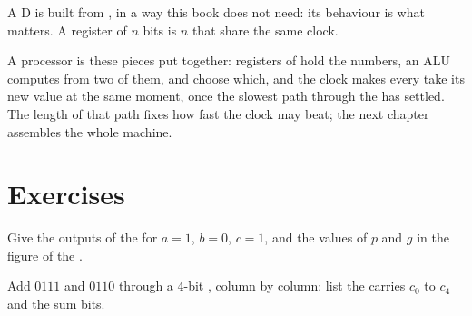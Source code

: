 A D  is built from , in a way this book does not need: its behaviour is what matters. A register of
$n$ bits is $n$  that share the same clock.

\label{lst:g11:gates-to-arithmetic-unit:dff}

\label{out:g11:gates-to-arithmetic-unit:dff}

\begin{remark}
A processor is these pieces put together: registers of  hold the numbers, an ALU computes from two of them,
 and  choose which, and the clock makes every  take its new value at the same moment,
once the slowest path through the  has settled. The length of that path fixes how fast the
clock may beat; the next chapter assembles the whole machine.
\end{remark}

\section{Exercises}\label{sec:g11:gates-to-arithmetic-unit:exercises}

\begin{exercise}[$\star$]\label{exo:g11:gates-to-arithmetic-unit:1}
Give the outputs of the  for $a = 1$, $b = 0$, $c = 1$, and the values of $p$ and $g$ in the figure of
the .
\end{exercise}

\begin{exercise}[$\star$]\label{exo:g11:gates-to-arithmetic-unit:2}
Add $0111$ and $0110$ through a $4$-bit , column by column: list the carries $c_0$ to $c_4$ and the
sum bits.
\end{exercise}

